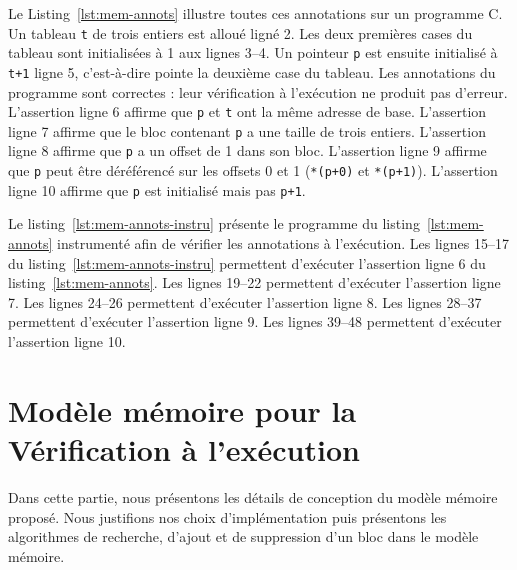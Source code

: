 

\begin{figure}[h!]

\end{figure}


Le Listing~\ref{lst:mem-annots} illustre toutes ces annotations sur un programme
C.
Un tableau \lstinline't' de trois entiers est alloué ligné 2.
Les deux premières cases du tableau sont initialisées à 1 aux lignes 3--4.
Un pointeur \lstinline'p' est ensuite initialisé à \lstinline't+1' ligne 5,
c'est-à-dire pointe la deuxième case du tableau.
Les annotations du programme sont correctes : leur vérification à l'exécution
ne produit pas d'erreur.
L'assertion ligne 6 affirme que \lstinline'p' et \lstinline't' ont la même
adresse de base.
L'assertion ligne 7 affirme que le bloc contenant \lstinline'p' a une taille de
trois entiers.
L'assertion ligne 8 affirme que \lstinline'p' a un offset de 1 dans son bloc.
L'assertion ligne 9 affirme que \lstinline'p' peut être déréférencé sur les
offsets 0 et 1 (\lstinline'*(p+0)' et \lstinline'*(p+1)').
L'assertion ligne 10 affirme que \lstinline'p' est initialisé mais pas
\lstinline'p+1'.

Le listing~\ref{lst:mem-annots-instru} présente le programme du
listing~\ref{lst:mem-annots} instrumenté afin de vérifier les annotations à
l'exécution.
Les lignes 15--17 du listing~\ref{lst:mem-annots-instru} permettent d'exécuter
l'assertion ligne 6 du listing~\ref{lst:mem-annots}.
Les lignes 19--22 permettent d'exécuter l'assertion ligne 7.
Les lignes 24--26 permettent d'exécuter l'assertion ligne 8.
Les lignes 28--37 permettent d'exécuter l'assertion ligne 9.
Les lignes 39--48 permettent d'exécuter l'assertion ligne 10.



\section{Modèle mémoire pour la Vérification à l'exécution}
\label{sec:mem-model}


Dans cette partie, nous présentons les détails de conception du modèle mémoire
proposé.
Nous justifions nos choix d'implémentation puis présentons les algorithmes de
recherche, d'ajout et de suppression d'un bloc dans le modèle mémoire.



